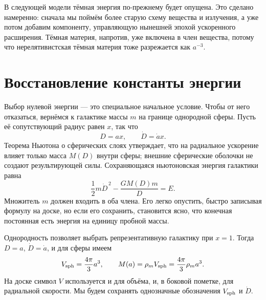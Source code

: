 В следующей модели тёмная энергия по-прежнему будет опущена. Это сделано намеренно: сначала мы поймём более старую схему вещества и излучения, а уже потом добавим компоненту, управляющую нынешней эпохой ускоренного расширения. Тёмная материя, напротив, уже включена в член вещества, потому что нерелятивистская тёмная материя тоже разрежается как \(a^{-3}\).

\begin{classroomqa}
\end{classroomqa}

\section{Восстановление константы энергии}

Выбор нулевой энергии — это специальное начальное условие. Чтобы от него отказаться, вернёмся к галактике массы \(m\) на границе однородной сферы. Пусть её сопутствующий радиус равен \(x\), так что
\begin{equation}
D=ax,
\qquad
\dot D=\dot a x.
\label{eq:c02-comoving-particle}
\end{equation}
Теорема Ньютона о сферических слоях утверждает, что на радиальное ускорение влияет только масса \(M(D)\) внутри сферы; внешние сферические оболочки не создают результирующей силы. Сохраняющаяся ньютоновская энергия галактики равна
\begin{equation}
\frac{1}{2}m\dot D^{\,2}-\frac{GM(D)m}{D}=E.
\label{eq:c02-newton-energy}
\end{equation}
Множитель \(m\) должен входить в оба члена. Его легко опустить, быстро записывая формулу на доске, но если его сохранить, становится ясно, что конечная постоянная есть энергия на единицу пробной массы.

Однородность позволяет выбрать репрезентативную галактику при \(x=1\). Тогда \(D=a\), \(\dot D=\dot a\), и для сферы имеем
\begin{equation}
V_{\rm sph}=\frac{4\pi}{3}a^3,
\qquad
M(a)=\rho_m V_{\rm sph}=\frac{4\pi}{3}\rho_m a^3.
\label{eq:c02-enclosed-mass}
\end{equation}
На доске символ \(V\) используется и для объёма, и, в боковой пометке, для радиальной скорости. Мы будем сохранять однозначные обозначения \(V_{\rm sph}\) и \(\dot D\).


